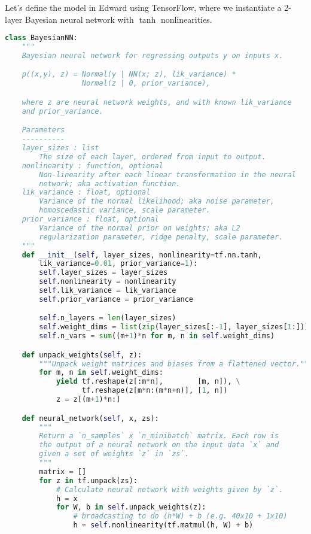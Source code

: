 Let's define the model in Edward using TensorFlow, where we
instantiate a 2-layer Bayesian neural network with $\tanh$
nonlinearities.
\begin{lstlisting}[language=Python]
class BayesianNN:
    """
    Bayesian neural network for regressing outputs y on inputs x.

    p((x,y), z) = Normal(y | NN(x; z), lik_variance) *
                  Normal(z | 0, prior_variance),

    where z are neural network weights, and with known lik_variance
    and prior_variance.

    Parameters
    ----------
    layer_sizes : list
        The size of each layer, ordered from input to output.
    nonlinearity : function, optional
        Non-linearity after each linear transformation in the neural
        network; aka activation function.
    lik_variance : float, optional
        Variance of the normal likelihood; aka noise parameter,
        homoscedastic variance, scale parameter.
    prior_variance : float, optional
        Variance of the normal prior on weights; aka L2
        regularization parameter, ridge penalty, scale parameter.
    """
    def __init__(self, layer_sizes, nonlinearity=tf.nn.tanh,
        lik_variance=0.01, prior_variance=1):
        self.layer_sizes = layer_sizes
        self.nonlinearity = nonlinearity
        self.lik_variance = lik_variance
        self.prior_variance = prior_variance

        self.n_layers = len(layer_sizes)
        self.weight_dims = list(zip(layer_sizes[:-1], layer_sizes[1:]))
        self.n_vars = sum((m+1)*n for m, n in self.weight_dims)

    def unpack_weights(self, z):
        """Unpack weight matrices and biases from a flattened vector."""
        for m, n in self.weight_dims:
            yield tf.reshape(z[:m*n],        [m, n]), \
                  tf.reshape(z[m*n:(m*n+n)], [1, n])
            z = z[(m+1)*n:]

    def neural_network(self, x, zs):
        """
        Return a `n_samples` x `n_minibatch` matrix. Each row is
        the output of a neural network on the input data `x` and
        given a set of weights `z` in `zs`.
        """
        matrix = []
        for z in tf.unpack(zs):
            # Calculate neural network with weights given by `z`.
            h = x
            for W, b in self.unpack_weights(z):
                # broadcasting to do (h*W) + b (e.g. 40x10 + 1x10)
                h = self.nonlinearity(tf.matmul(h, W) + b)


\end{lstlisting}
